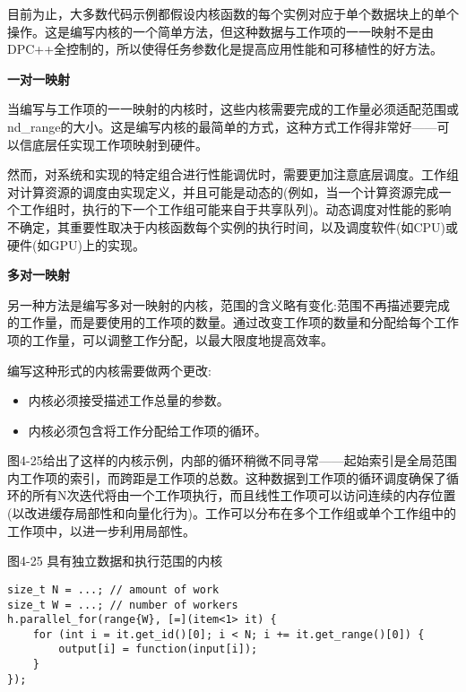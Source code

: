 目前为止，大多数代码示例都假设内核函数的每个实例对应于单个数据块上的单个操作。这是编写内核的一个简单方法，但这种数据与工作项的一一映射不是由DPC++全控制的，所以使得任务参数化是提高应用性能和可移植性的好方法。\par

\hspace*{\fill} \par %
\textbf{一对一映射}

当编写与工作项的一一映射的内核时，这些内核需要完成的工作量必须适配范围或nd\_range的大小。这是编写内核的最简单的方式，这种方式工作得非常好——可以信底层任实现工作项映射到硬件。\par

然而，对系统和实现的特定组合进行性能调优时，需要更加注意底层调度。工作组对计算资源的调度由实现定义，并且可能是动态的(例如，当一个计算资源完成一个工作组时，执行的下一个工作组可能来自于共享队列)。动态调度对性能的影响不确定，其重要性取决于内核函数每个实例的执行时间，以及调度软件(如CPU)或硬件(如GPU)上的实现。\par

\hspace*{\fill} \par %
\textbf{多对一映射}

另一种方法是编写多对一映射的内核，范围的含义略有变化:范围不再描述要完成的工作量，而是要使用的工作项的数量。通过改变工作项的数量和分配给每个工作项的工作量，可以调整工作分配，以最大限度地提高效率。\par

编写这种形式的内核需要做两个更改:\par

\begin{itemize}
	\item 内核必须接受描述工作总量的参数。
	\item 内核必须包含将工作分配给工作项的循环。
\end{itemize}

图4-25给出了这样的内核示例，内部的循环稍微不同寻常——起始索引是全局范围内工作项的索引，而跨距是工作项的总数。这种数据到工作项的循环调度确保了循环的所有N次迭代将由一个工作项执行，而且线性工作项可以访问连续的内存位置(以改进缓存局部性和向量化行为)。工作可以分布在多个工作组或单个工作组中的工作项中，以进一步利用局部性。\par

\hspace*{\fill} \par %
图4-25 具有独立数据和执行范围的内核
\begin{lstlisting}[caption={}]
size_t N = ...; // amount of work
size_t W = ...; // number of workers
h.parallel_for(range{W}, [=](item<1> it) {
	for (int i = it.get_id()[0]; i < N; i += it.get_range()[0]) {
		output[i] = function(input[i]);
	}
});
\end{lstlisting}

